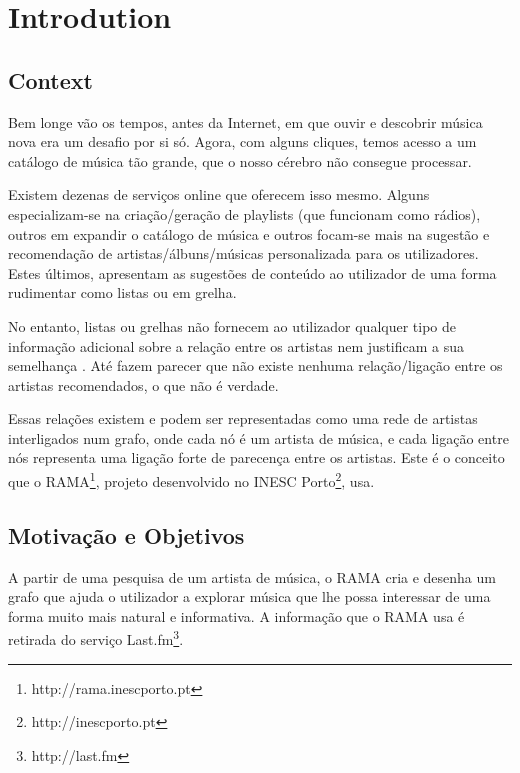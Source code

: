 
\chapter{Introdution} \label{chap:intro}


\section*{}

\section{Context} \label{sec:context}

Bem longe vão os tempos, antes da Internet, em que ouvir e descobrir música nova era um desafio por si só.
Agora, com alguns cliques, temos acesso a um catálogo de música tão grande, que o nosso cérebro não consegue processar.

Existem dezenas de serviços online que oferecem isso mesmo.
Alguns especializam-se na criação/geração de playlists (que funcionam como rádios), outros em expandir o catálogo de música e outros focam-se mais na sugestão e recomendação de artistas/álbuns/músicas personalizada para os utilizadores.
Estes últimos, apresentam as sugestões de conteúdo ao utilizador de uma forma rudimentar como listas ou em grelha.

No entanto, listas ou grelhas não fornecem ao utilizador qualquer tipo de informação adicional sobre a relação entre os artistas nem justificam a sua semelhança \cite{Lamere2008}.
Até fazem parecer que não existe nenhuma relação/ligação entre os artistas recomendados, o que não é verdade.

Essas relações existem e podem ser representadas como uma rede de artistas interligados num grafo, onde cada nó é um artista de música, e cada ligação entre nós representa uma ligação forte de parecença entre os artistas.
Este é o conceito que o RAMA\footnote{http://rama.inescporto.pt}, projeto desenvolvido no INESC Porto\footnote{http://inescporto.pt}, usa. \cite{Costa2008} \cite{Sarmento2009} \cite{Costa2009} \cite{Gouyon2011}



\section{Motivação e Objetivos} \label{sec:goals}


A partir de uma pesquisa de um artista de música, o RAMA cria e desenha um grafo que ajuda o utilizador a explorar música que lhe possa interessar de uma forma muito mais natural e informativa.
A informação que o RAMA usa é retirada do serviço Last.fm\footnote{http://last.fm}.

